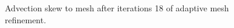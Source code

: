 \documentclass[final,leqno]{siamltex}
\begin{document}
\begin{figure}[!h]
\centering
{}
\caption{Advection skew to mesh after iterations 18 of adaptive mesh refinement.}
\end{figure}
\end{document}

